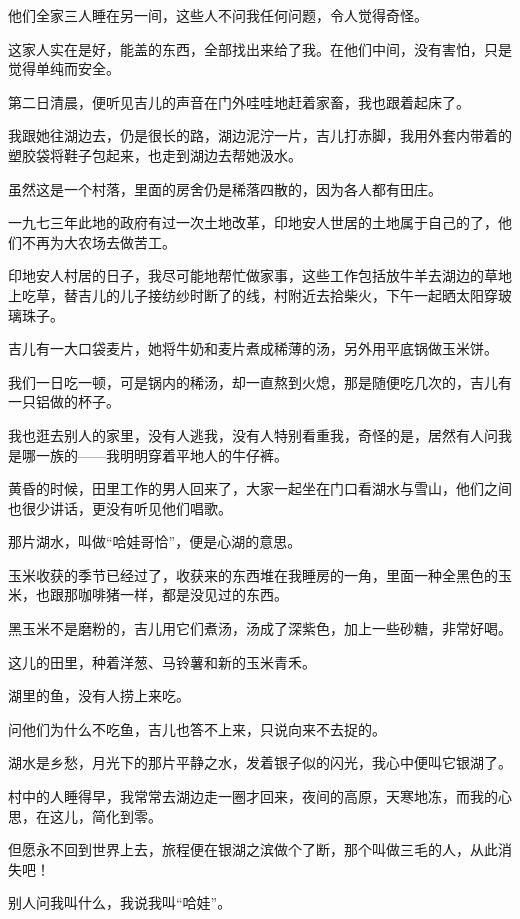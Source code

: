 \par 他们全家三人睡在另一间，这些人不问我任何问题，令人觉得奇怪。
\par 这家人实在是好，能盖的东西，全部找出来给了我。在他们中间，没有害怕，只是觉得单纯而安全。
\par 第二日清晨，便听见吉儿的声音在门外哇哇地赶着家畜，我也跟着起床了。
\par 我跟她往湖边去，仍是很长的路，湖边泥泞一片，吉儿打赤脚，我用外套内带着的塑胶袋将鞋子包起来，也走到湖边去帮她汲水。
\par 虽然这是一个村落，里面的房舍仍是稀落四散的，因为各人都有田庄。
\par 一九七三年此地的政府有过一次土地改革，印地安人世居的土地属于自己的了，他们不再为大农场去做苦工。
\par 印地安人村居的日子，我尽可能地帮忙做家事，这些工作包括放牛羊去湖边的草地上吃草，替吉儿的儿子接纺纱时断了的线，村附近去拾柴火，下午一起晒太阳穿玻璃珠子。
\par 吉儿有一大口袋麦片，她将牛奶和麦片煮成稀薄的汤，另外用平底锅做玉米饼。
\par 我们一日吃一顿，可是锅内的稀汤，却一直熬到火熄，那是随便吃几次的，吉儿有一只铝做的杯子。
\par 我也逛去别人的家里，没有人逃我，没有人特别看重我，奇怪的是，居然有人问我是哪一族的——我明明穿着平地人的牛仔裤。
\par 黄昏的时候，田里工作的男人回来了，大家一起坐在门口看湖水与雪山，他们之间也很少讲话，更没有听见他们唱歌。
\par 那片湖水，叫做“哈娃哥恰”，便是心湖的意思。
\par 玉米收获的季节已经过了，收获来的东西堆在我睡房的一角，里面一种全黑色的玉米，也跟那咖啡猪一样，都是没见过的东西。
\par 黑玉米不是磨粉的，吉儿用它们煮汤，汤成了深紫色，加上一些砂糖，非常好喝。
\par 这儿的田里，种着洋葱、马铃薯和新的玉米青禾。
\par 湖里的鱼，没有人捞上来吃。
\par 问他们为什么不吃鱼，吉儿也答不上来，只说向来不去捉的。
\par 湖水是乡愁，月光下的那片平静之水，发着银子似的闪光，我心中便叫它银湖了。
\par 村中的人睡得早，我常常去湖边走一圈才回来，夜间的高原，天寒地冻，而我的心思，在这儿，简化到零。
\par 但愿永不回到世界上去，旅程便在银湖之滨做个了断，那个叫做三毛的人，从此消失吧！
\par 别人问我叫什么，我说我叫“哈娃”。
